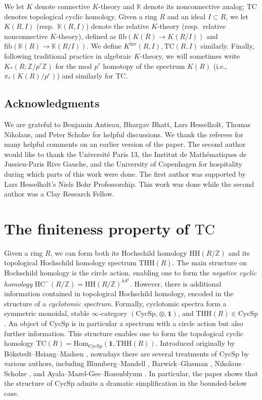 \documentclass{amsart}
\newcommand{\knf}{K^{\mathrm{inv}}}
\newcommand{\THH}{\mathrm{THH}}
\newcommand{\HH}{\mathrm{HH}}
\renewcommand{\hom}{\mathrm{Hom}}
\newcommand{\HC}{\mathrm{HC}}
\theoremstyle{definition}
\newcommand{\CycSp}{\mathrm{CycSp}}
\newcommand{\TC}{\mathrm{TC}}
\begin{document}
We let $K$ denote connective $K$-theory and $\mathbb{K}$ denote its
nonconnective analog; $\TC$ denotes topological cyclic homology. 
Given a ring $R$ and an ideal $I \subset R$, we let $K(R, I)$
(resp.~$\mathbb{K}(R, I)$) denote the relative $K$-theory (resp.~relative nonconnective
$K$-theory), defined  as $\mathrm{fib}(K(R) \to K(R/I))$ and
$\mathrm{fib}(\mathbb{K}(R) \to \mathbb{K}(R/I))$. We define $ \knf(R, I), \TC(R, I)$
similarly. Finally, following traditional practice in algebraic $K$-theory, we
will sometimes write $K_*(R; \mathbb{Z}/p^r \mathbb{Z})$ for the mod $p^r$
homotopy of the spectrum $K(R)$ (i.e., $\pi_*( K(R)/p^r)$) and similarly for
$\TC$. 

\subsection*{Acknowledgments}
We are grateful to Benjamin Antieau, Bhargav Bhatt, Lars Hesselholt, Thomas Nikolaus, and Peter
Scholze for helpful discussions. 
We thank the referees for many helpful comments on an earlier version of the
paper. 
The second author would like to thank the Universit\'e Paris 13, the Institut de
Math\'ematiques de Jussieu-Paris Rive Gauche, and the University of Copenhagen for hospitality
during which parts of this work were done. 
The first author was supported by Lars Hesselholt's Niels Bohr Professorship.
This work was done while the second author was a Clay Research Fellow.  


\section{The finiteness property of $\TC$}
\label{section_finiteness}

Given a ring $R$, we can form both its Hochschild homology $\HH(R/\mathbb{Z})$
and its topological Hochschild homology spectrum $\THH(R)$.  The main structure on Hochschild homology is the circle action,
enabling one to form the \emph{negative cyclic homology} $\HC^-(R/\mathbb{Z}) =
\HH(R/\mathbb{Z})^{hS^1}$. However,
there is additional information contained in topological Hochschild homology, encoded in the structure of a \emph{cyclotomic spectrum}.
Formally, cyclotomic spectra form a symmetric monoidal, stable $\infty$-category $(\CycSp,
\otimes, \mathbf{1})$, and $\THH(R) \in \CycSp$.  
An object of $\CycSp$ is in particular a spectrum with a circle action but also
further information. 
This structure enables one to form the topological cyclic homology $\TC(R) =
\hom_{\CycSp}(\mathbf{1}, \THH(R))$. 
Introduced originally by B\"okstedt--Hsiang--Madsen \cite{BHM}, nowadays there are
several treatments 
of $\CycSp$ by various
authors, including Blumberg--Mandell \cite{BMcyc},
Barwick--Glasman \cite{BG}, Nikolaus--Scholze \cite{nikolaus-scholze}, and  Ayala--Mazel-Gee--Rozenblyum
\cite{ayala-mg-rozenblyum}. 
In particular, the paper \cite{nikolaus-scholze} shows that the structure of $\CycSp$
 admits a dramatic simplification in the bounded-below case. 
\end{document}
